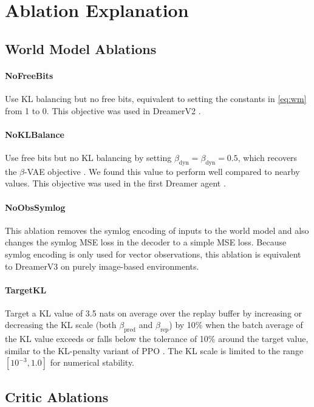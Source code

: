
\section{Ablation Explanation}

\subsection*{World Model Ablations}

\paragraph{NoFreeBits} Use KL balancing but no free bits, equivalent to setting the constants in \cref{eq:wm} from 1 to 0. This objective was used in DreamerV2 \citep{hafner2020dreamerv2}.
\paragraph{NoKLBalance} Use free bits but no KL balancing by setting $\beta_{\mathrm{dyn}} = \beta_{\mathrm{dyn}} = 0.5$, which recovers the $\beta$-VAE objective \citep{higgins2016beta}. We found this value to perform well compared to nearby values. This objective was used in the first Dreamer agent \citep{hafner2019dreamer}.
\paragraph{NoObsSymlog} This ablation removes the symlog encoding of inputs to the world model and also changes the symlog MSE loss in the decoder to a simple MSE loss. Because symlog encoding is only used for vector observations, this ablation is equivalent to DreamerV3 on purely image-based environments.
\paragraph{TargetKL} Target a KL value of 3.5 nats on average over the replay buffer by increasing or decreasing the KL scale (both $\beta_{\mathrm{pred}}$ and $\beta_{\mathrm{rep}}$) by 10\% when the batch average of the KL value exceeds or falls below the tolerance of 10\% around the target value, similar to the KL-penalty variant of PPO \citep{schulman2017ppo}. The KL scale is limited to the range $[10^{-3}, 1.0]$ for numerical stability.

\subsection*{Critic Ablations}

